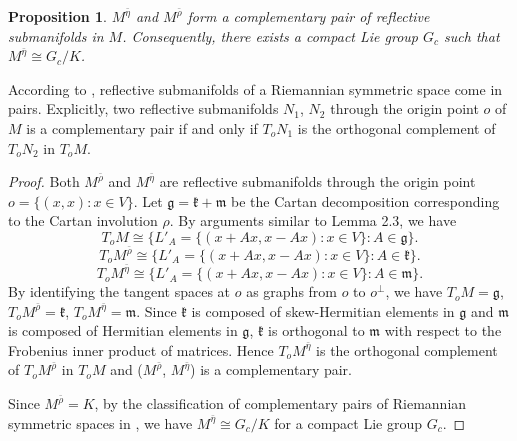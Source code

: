 \documentclass{article}
\newtheorem{prop}{Proposition}[section]
\begin{document}
\begin{prop}
$M^{\bar{\eta}}$ and $M^{\bar{\rho}}$ form a complementary  pair of reflective submanifolds in $M$. Consequently,  there exists a compact Lie group $G_c$ such that $M^{\bar{\eta}} \cong G_c/K$.
\end{prop}
According to \cite{L1}\cite{L2}, reflective submanifolds of a Riemannian symmetric space come in pairs. Explicitly, two reflective submanifolds $N_1$, $N_2$ through the origin point $o$ of $M$
is a complementary  pair if and only if $T_oN_1$ is the orthogonal complement of $T_oN_2$ in $T_oM$.
\begin{proof}
Both $M^{\bar{\rho}}$ and $M^{\bar{\eta}}$ are reflective submanifolds through the origin point $o=\{(x,x): x \in V\}$.
Let $\mathfrak{g}=\mathfrak{k}+\mathfrak{m}$ be the Cartan decomposition corresponding to the Cartan involution $\rho$. By arguments similar to
Lemma 2.3, we have
\[
T_{o}M \cong \{L'_A=\{(x+Ax,x-Ax): x \in V\}:  A \in \mathfrak{g} \} .
\]
\[
T_{o}M^{\bar{\rho}}  \cong \{L'_A=\{(x+Ax,x-Ax): x \in V\}:  A \in \mathfrak{k} \}.
\]
\[
T_{o}M^{\bar{\eta}} \cong \{L'_A=\{(x+Ax,x-Ax): x \in V\}:  A \in \mathfrak{m} \}.
\]
By identifying the tangent spaces at $o$ as graphs from  $o$ to $o^\perp$, we have $T_{o}M=\mathfrak{g}$, $T_{o}M^{\bar{\rho}}=\mathfrak{k}$, $T_{o}M^{\bar{\eta}}=\mathfrak{m}$.
Since $\mathfrak{k}$ is composed of skew-Hermitian elements in $\mathfrak{g}$ and $\mathfrak{m}$ is composed of Hermitian elements in $\mathfrak{g}$, $\mathfrak{k}$ is orthogonal to
$\mathfrak{m}$ with respect to the Frobenius inner product of matrices.
Hence $T_oM^{\bar{\eta}}$ is the orthogonal complement of $T_oM^{\bar{\rho}}$ in $T_oM$ and
 ($M^{\bar{\rho}}$, $M^{\bar{\eta}}$) is a complementary  pair.

Since $M^{\bar{\rho}}=K$, by the classification of complementary pairs of Riemannian symmetric spaces in \cite{L2}, we have $M^{\bar{\eta}} \cong G_c/K$
for a compact Lie group $G_c$.
\end{proof}
\end{document}
